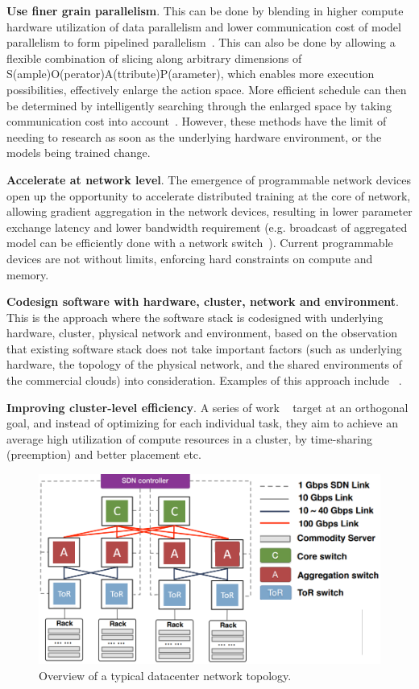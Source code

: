 \noindent\textbf{Use finer grain parallelism}. This can be done by blending in higher compute hardware utilization of data parallelism and lower communication cost of model parallelism to form pipelined parallelism~\cite{harlap2018pipedream}. This can also be done by allowing a flexible combination of slicing along arbitrary dimensions of S(ample)O(perator)A(ttribute)P(arameter), which enables more execution possibilities, effectively enlarge the action space. More efficient schedule can then be determined by intelligently searching through the enlarged space by taking communication cost into account~\cite{jia2018beyond}. However, these methods have the limit of needing to research as soon as the underlying hardware environment, or the models being trained change.

\noindent\textbf{Accelerate at network level}. The emergence of programmable network devices open up the opportunity to accelerate distributed training at the core of network, allowing gradient aggregation in the network devices, resulting in lower parameter exchange latency and lower bandwidth requirement (e.g. broadcast of aggregated model can be efficiently done with a network switch~\cite{sapio2019scaling,luomotivating}). Current programmable devices are not without limits, enforcing hard constraints on compute and memory.

\noindent\textbf{Codesign software with hardware, cluster, network and environment}. This is the approach where the software stack is codesigned with underlying hardware, cluster, physical network and environment, based on the observation that existing software stack does not take important factors (such as underlying hardware, the topology of the physical network, and the shared environments of the commercial clouds) into consideration. Examples of this approach include \plink{}~\cite{phubsocc, phubsysml}.

\noindent\textbf{Improving cluster-level efficiency}. A series of work ~\cite{222611,Shen2018NexusA} target at an orthogonal goal, and instead of optimizing for each individual task, they aim to achieve an average high utilization of compute resources in a cluster, by time-sharing (preemption) and better placement etc.

\begin{figure}[t!]
	\centering
	\includegraphics[width=.6\linewidth, trim=2 3 3 3,clip]{Figures/dc.png}
	\caption{Overview of a typical datacenter network topology.}
	\label{fig:dc}
\end{figure}

